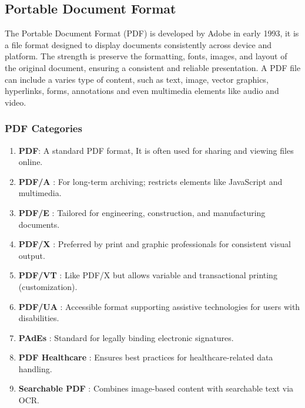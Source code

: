 \documentclass[12pt,oneside,openright,a4paper]{cpe-english-project}
\begin{document}
\subsection{Portable Document Format}

The Portable Document Format (PDF) is developed by Adobe in early 1993, it is a file format designed to display documents consistently across device and platform. The strength is preserve the formatting, fonts, images, and layout of the original document, ensuring a consistent and reliable presentation. A PDF file can include a varies type of content, such as text, image, vector graphics, hyperlinks, forms, annotations and even multimedia elements like audio and video.

\subsubsection {PDF Categories}

\begin{enumerate}
	\item \textbf{PDF}: A standard PDF format, It is often used for sharing and viewing files online.
	
	\item \textbf{PDF/A} : For long-term archiving; restricts elements like JavaScript and multimedia.
	
	\item \textbf{PDF/E} : Tailored for engineering, construction, and manufacturing documents.
	
	\item \textbf{PDF/X} : Preferred by print and graphic professionals for consistent visual output.
	
	\item \textbf{PDF/VT} : Like PDF/X but allows variable and transactional printing (customization).
	
	\item \textbf{PDF/UA} : Accessible format supporting assistive technologies for users with disabilities.

	\item \textbf{PAdEs} : Standard for legally binding electronic signatures.

	\item \textbf{PDF Healthcare} : Ensures best practices for healthcare-related data handling.

	\item \textbf{Searchable PDF} : Combines image-based content with searchable text via OCR.

\end{enumerate}
\end{document}
